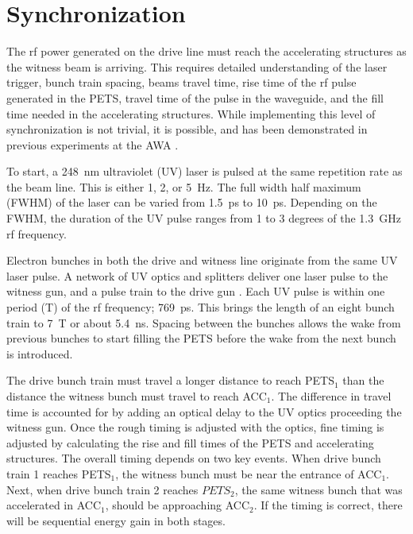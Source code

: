 \documentclass[letterpaper,  %
              ]{jacow-2_3}   %
\begin{document}
\section{Synchronization}
The rf power generated on the drive line
must reach the accelerating structures as the witness beam is arriving.
This requires detailed understanding of the laser trigger, 
bunch train spacing, beams travel time, 
rise time of the rf pulse generated in the PETS, 
travel time of the pulse in the waveguide, and 
the fill time needed in the accelerating structures. 
While implementing this level of synchronization is not trivial, 
it is possible, and has been demonstrated in previous experiments
at the AWA \cite{tba}. 


To start, a \SI{248}{nm} ultraviolet (UV) laser is pulsed at 
the same repetition rate as the beam line. This is either 1, 2, or \SI{5}{Hz}.
The full width half maximum (FWHM) of the laser can be varied from \SI{1.5}{ps}
to \SI{10}{ps}. Depending on the FWHM, the duration of the UV 
pulse ranges from 1 to 3 degrees of the \SI{1.3}{GHz} rf frequency. 
 
Electron bunches in both the drive and witness line 
originate from the same UV laser pulse. 
A  network of UV optics and splitters 
deliver one laser pulse to the witness gun, and a pulse train to the drive gun \cite{korea}.
Each UV pulse is within one period (T) of the rf frequency; \SI{769}{ps}.
This brings the length of an eight bunch train to 7~T or about \SI{5.4}{ns}.
Spacing between the bunches allows the wake from previous bunches to 
start filling the PETS before the wake from the next bunch is introduced.

The drive bunch train must travel a longer distance to reach PETS$_1$ 
than the distance the witness bunch must travel to reach ACC$_1$.
The difference in travel time is accounted for by adding an optical delay 
to the UV optics proceeding the witness gun. 
Once the rough timing is adjusted with the optics, fine timing is adjusted
by calculating the rise and fill times of the PETS and accelerating structures. 
The overall timing depends on two key events. When drive bunch train 1 reaches PETS$_1$, 
the witness bunch must be near the entrance of ACC$_1$. Next, when 
drive bunch train 2 reaches $PETS_2$, the same witness bunch that was accelerated
in ACC$_1$, should be approaching ACC$_2$. If the timing is correct, 
there will be sequential energy gain in both stages.
\end{document}
